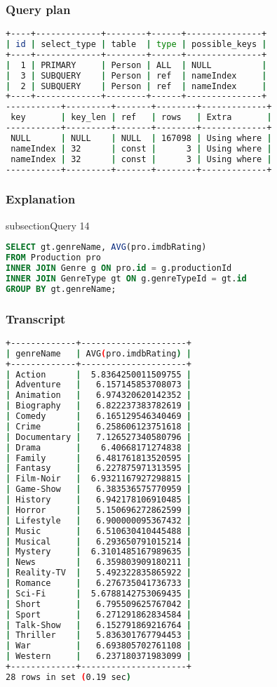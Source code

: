 \subsubsection{Query plan}
\begin{lstlisting}[language=bash]
+----+-------------+--------+------+---------------+
| id | select_type | table  | type | possible_keys |
+----+-------------+--------+------+---------------+
|  1 | PRIMARY     | Person | ALL  | NULL          |
|  3 | SUBQUERY    | Person | ref  | nameIndex     |
|  2 | SUBQUERY    | Person | ref  | nameIndex     |
+----+-------------+--------+------+---------------+
-----------+---------+-------+--------+-------------+
 key       | key_len | ref   | rows   | Extra       |
-----------+---------+-------+--------+-------------+
 NULL      | NULL    | NULL  | 167098 | Using where |
 nameIndex | 32      | const |      3 | Using where |
 nameIndex | 32      | const |      3 | Using where |
-----------+---------+-------+--------+-------------+
\end{lstlisting}

\subsubsection{Explanation}


subsection{Query 14}
\begin{lstlisting}[language=sql]
SELECT gt.genreName, AVG(pro.imdbRating)
FROM Production pro
INNER JOIN Genre g ON pro.id = g.productionId
INNER JOIN GenreType gt ON g.genreTypeId = gt.id
GROUP BY gt.genreName;
\end{lstlisting}

\subsubsection{Transcript}
\begin{lstlisting}[language=bash]
+-------------+---------------------+
| genreName   | AVG(pro.imdbRating) |
+-------------+---------------------+
| Action      |  5.8364250011509755 |
| Adventure   |   6.157145853708073 |
| Animation   |   6.974320620142352 |
| Biography   |   6.822237383782619 |
| Comedy      |   6.165129546340469 |
| Crime       |   6.258606123751618 |
| Documentary |   7.126527340580796 |
| Drama       |    6.40668171274838 |
| Family      |   6.481761813520595 |
| Fantasy     |   6.227875971313595 |
| Film-Noir   |  6.9321167927298815 |
| Game-Show   |   6.383536575770959 |
| History     |   6.942178106910485 |
| Horror      |   5.150696272862599 |
| Lifestyle   |   6.900000095367432 |
| Music       |   6.510630410445488 |
| Musical     |   6.293650791015214 |
| Mystery     |  6.3101485167989635 |
| News        |   6.359803909180211 |
| Reality-TV  |   5.492322835865922 |
| Romance     |   6.276735041736733 |
| Sci-Fi      |  5.6788142753069435 |
| Short       |   6.795509625767042 |
| Sport       |   6.271291862834584 |
| Talk-Show   |   6.152791869216764 |
| Thriller    |   5.836301767794453 |
| War         |   6.693805702761108 |
| Western     |   6.237180371983099 |
+-------------+---------------------+
28 rows in set (0.19 sec)
\end{lstlisting}

